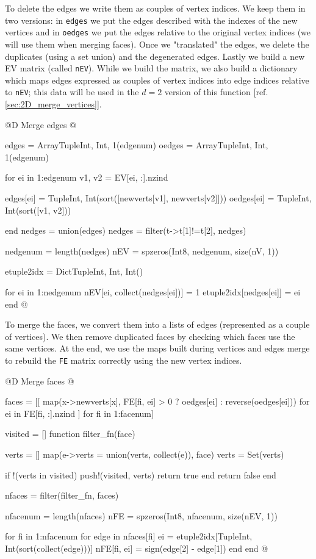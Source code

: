 To delete the edges we write them as couples of vertex
indices. We keep them in two versions: in \texttt{edges}
we put the edges described with the indexes of the new vertices
and in \texttt{oedges} we put the edges relative to the original vertex
indices (we will use them when merging faces). Once we "translated"
the edges, we delete the duplicates (using a set union) and the
degenerated edges. Lastly we build a new EV matrix 
(called \texttt{nEV}). While we
build the matrix, we also build a dictionary which maps edges expressed
as couples of vertex indices into edge indices relative to \texttt{nEV};
this data will be used in the $d=2$ version of this function 
[ref. \ref{sec:2D_merge_vertices}].

@D Merge edges
@{edges = Array{Tuple{Int, Int}, 1}(edgenum)
oedges = Array{Tuple{Int, Int}, 1}(edgenum)

for ei in 1:edgenum
    v1, v2 = EV[ei, :].nzind
    
    edges[ei] = Tuple{Int, Int}(sort([newverts[v1], newverts[v2]]))
    oedges[ei] = Tuple{Int, Int}(sort([v1, v2]))

end
nedges = union(edges)
nedges = filter(t->t[1]!=t[2], nedges)

nedgenum = length(nedges)
nEV = spzeros(Int8, nedgenum, size(nV, 1))

etuple2idx = Dict{Tuple{Int, Int}, Int}()

for ei in 1:nedgenum
    nEV[ei, collect(nedges[ei])] = 1
    etuple2idx[nedges[ei]] = ei
end
@}

To merge the faces, we convert them into a lists of
edges (represented as a couple of vertices). We then remove duplicated faces
by checking which faces use the same vertices. At the end, we use the
maps built during vertices and edges merge to rebuild the \texttt{FE}
matrix correctly using the new vertex indices.

@D Merge faces
@{faces = [[
    map(x->newverts[x], FE[fi, ei] > 0 ? oedges[ei] : reverse(oedges[ei]))
    for ei in FE[fi, :].nzind
] for fi in 1:facenum]


visited = []
function filter_fn(face)

    verts = []
    map(e->verts = union(verts, collect(e)), face)
    verts = Set(verts)

    if !(verts in visited)
        push!(visited, verts)
        return true
    end
    return false
end

nfaces = filter(filter_fn, faces)

nfacenum = length(nfaces)
nFE = spzeros(Int8, nfacenum, size(nEV, 1))

for fi in 1:nfacenum
    for edge in nfaces[fi]
        ei = etuple2idx[Tuple{Int, Int}(sort(collect(edge)))]
        nFE[fi, ei] = sign(edge[2] - edge[1])
    end
end
@}




